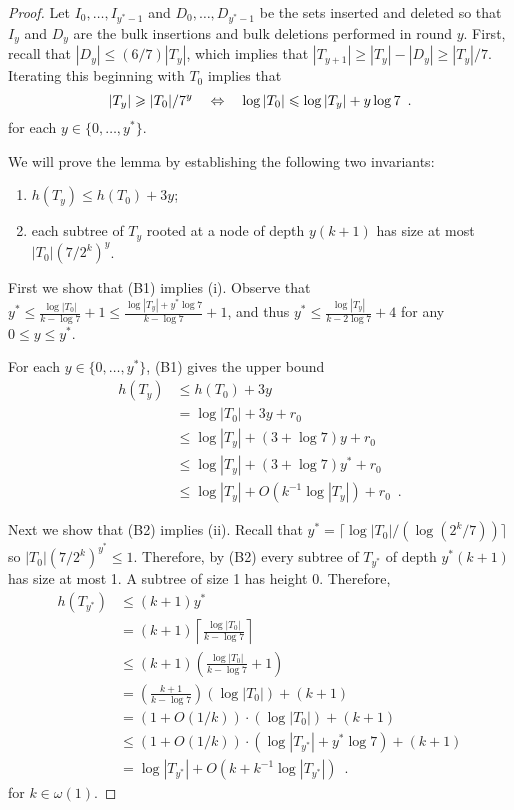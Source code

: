 \documentclass[kpfonts]{patmorin}
\newcommand{\snote}[1]{\fcolorbox{red}{yellow}{#1}}
\let\le\leqslant
\let\ge\geqslant
\begin{document}
\begin{proof}
  Let $I_0,\ldots,I_{y^*-1}$ and $D_0,\ldots,D_{y^*-1}$ be the sets inserted and deleted so that $I_y$ and $D_y$ are the bulk insertions and bulk deletions performed in round $y$.  First, recall that $|D_y|\le (6/7)|T_y|$, which implies that $|T_{y+1}|\ge |T_y|-|D_y|\ge |T_y|/7$.  Iterating this beginning with $T_0$ implies that 
  \begin{equation}
    |T_y|\ge |T_0|/7^y \quad \Leftrightarrow \quad \log|T_0| \le \log|T_y| + y\log 7 \enspace . \eqlabel{height-diff}
  \end{equation}
  for each $y\in\{0,\ldots,y^*\}$. 


  We will prove the lemma by establishing the following two invariants:
  \begin{enumerate}[(B1)]
    \item $h(T_y)\le h(T_0) + 3y$;
    \item each subtree of $T_y$ rooted at a node of depth $y(k+1)$ has size at most $|T_0|(7/2^k)^{y}$.
  \end{enumerate}

  First we show that (B1) implies (i). Observe that $y^*\le \tfrac{\log |T_0|}{k-\log 7}+1\le \tfrac{\log |T_y|+y^*\log 7}{k-\log 7}+1$, and thus $y^*\le \tfrac{\log |T_y|}{k-2\log 7}+4$ for any $0\le y\le y^*$.


  For each  $y\in\{0,\ldots,y^*\}$, (B1) gives the upper bound
  \begin{align}
       h(T_y) & \le h(T_0) + 3y \nonumber \\
              &= \log|T_0| + 3y + r_0 \nonumber \\
              &\le \log |T_y| + (3+\log 7)y + r_0 \nonumber \\
              &\le \log |T_y| + (3+\log 7)y^* + r_0 \nonumber \\
              &\le \log |T_y| + O(k^{-1}\log|T_y|) + r_0 \enspace .
  \end{align}

  Next we show that (B2) implies (ii).  Recall that $y^*=\lceil\log|T_0|/(\log(2^k/7))\rceil$ so
  $|T_{0}|(7/2^k)^{y^*} \le 1$.  Therefore, by (B2) every subtree of $T_{y^*}$ of depth $y^*(k+1)$ has size at most 1.  A subtree of size 1 has height 0.  Therefore,
  \begin{align*}
    h(T_{y^*}) & \le (k+1)y^* \\
    & = (k+1)\left\lceil \frac{\log|T_0|}{k-\log 7}\right\rceil \\
    & \le (k+1)\left(\frac{\log|T_0|}{k-\log 7 } + 1\right)\\
    & = \left(\frac{k+1}{k-\log 7}\right)\left(\log|T_0|\right) + (k+1)\\
    & = (1+O(1/k))\cdot(\log|T_0|) + (k+1) \\
    & \le (1+O(1/k))\cdot(\log|T_{y^*}| + y^*\log 7) + (k+1) \\
    & = \log|T_{y^*}| + O(k+k^{-1}\log |T_{y^*}|) \enspace .
  \end{align*}
  for $k\in\omega(1)$.  



\end{proof}
\end{document}

